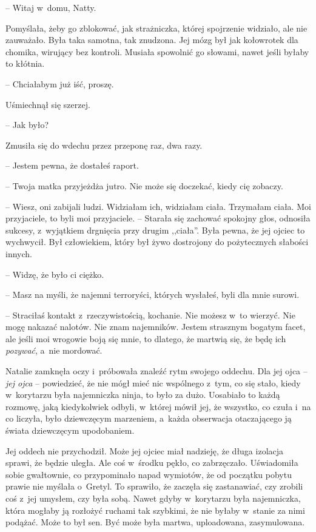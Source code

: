 \documentclass[oneside,polish,11pt,sfheadings]{mwbk}
\begin{document}
-- Witaj w~domu, Natty.

Pomyślała, żeby go zblokować, jak strażniczka, której spojrzenie
widziało, ale nie zauważało. Była taka samotna, tak znudzona. Jej mózg
był jak kołowrotek dla chomika, wirujący bez kontroli. Musiała spowolnić
go słowami, nawet jeśli byłaby to kłótnia.

-- Chciałabym już iść, proszę.

Uśmiechnął się szerzej. 

-- Jak było?

Zmusiła się do wdechu przez przeponę raz, dwa razy. 

-- Jestem pewna, że
dostałeś raport.

-- Twoja matka przyjeżdża jutro. Nie może się doczekać, kiedy cię
zobaczy.

-- Wiesz, oni zabijali ludzi. Widziałam ich, widziałam ciała. Trzymałam
ciała. Moi przyjaciele, to byli moi przyjaciele. -- Starała się zachować
spokojny głos, odnosiła sukcesy, z~wyjątkiem drgnięcia przy drugim
,,ciała''. Była pewna, że jej ojciec to wychwycił. Był człowiekiem,
który był żywo dostrojony do pożytecznych słabości innych.

-- Widzę, że było ci ciężko.

-- Masz na myśli, że najemni terroryści, których wysłałeś, byli dla mnie
surowi.

-- Straciłaś kontakt z~rzeczywistością, kochanie. Nie możesz w~to
wierzyć. Nie mogę nakazać nalotów. Nie znam najemników. Jestem strasznym
bogatym facet, ale jeśli moi wrogowie boją się mnie, to dlatego, że
martwią się, że będę ich \textit{pozywać}, a~nie mordować.

Natalie zamknęła oczy i~próbowała znaleźć rytm swojego oddechu. Dla jej
ojca -- \textit{jej ojca} -- powiedzieć, że nie mógł mieć nic wspólnego z~tym, co się stało, kiedy w~korytarzu była najemniczka ninja, to było za
dużo. Uosabiało to każdą rozmowę, jaką kiedykolwiek odbyli, w~której
mówił jej, że wszystko, co czuła i~na co liczyła, było dziewczęcym
marzeniem, a~każda obserwacja otaczającego ją świata dziewczęcym
upodobaniem.

Jej oddech nie przychodził. Może jej ojciec miał nadzieję, że długa
izolacja sprawi, że będzie uległa. Ale coś w~środku pękło, co
zabrzęczało. Uświadomiła sobie gwałtownie, co przypominało napad
wymiotów, że od początku pobytu prawie nie myślała o~Gretyl. To
sprawiło, że zaczęła się zastanawiać, czy zrobili coś z~jej umysłem, czy
była sobą. Nawet gdyby w~korytarzu była najemniczka, która mogłaby ją
rozłożyć ruchami tak szybkimi, że nie byłaby w~stanie za nimi podążać.
Może to był sen. Być może była martwa, uploadowana, zasymulowana.
\end{document}
